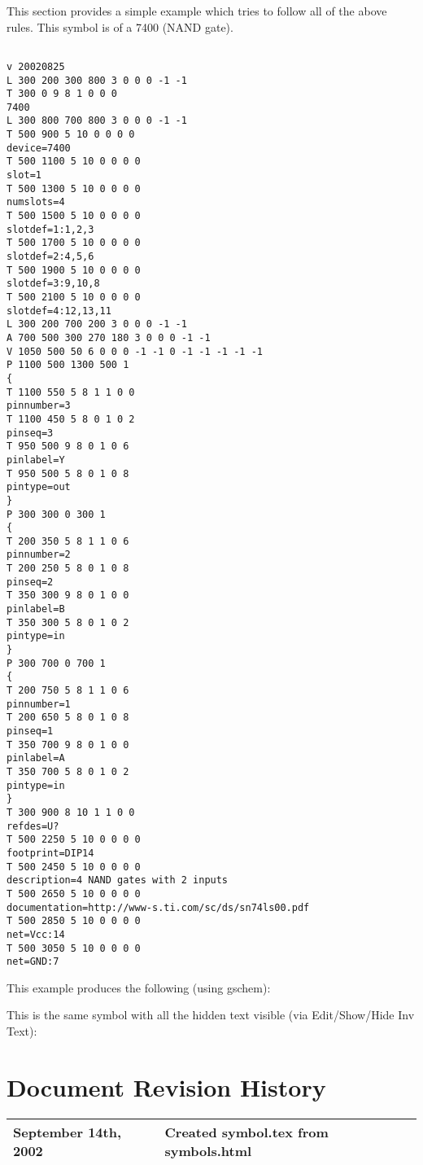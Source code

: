 \documentclass{article}
\begin{document}
This section provides a simple example which tries to follow all of the above
rules.  This symbol is of a 7400 (NAND gate).

\begin{verbatim}

v 20020825
L 300 200 300 800 3 0 0 0 -1 -1
T 300 0 9 8 1 0 0 0
7400
L 300 800 700 800 3 0 0 0 -1 -1
T 500 900 5 10 0 0 0 0
device=7400
T 500 1100 5 10 0 0 0 0
slot=1
T 500 1300 5 10 0 0 0 0
numslots=4
T 500 1500 5 10 0 0 0 0
slotdef=1:1,2,3
T 500 1700 5 10 0 0 0 0
slotdef=2:4,5,6
T 500 1900 5 10 0 0 0 0
slotdef=3:9,10,8
T 500 2100 5 10 0 0 0 0
slotdef=4:12,13,11
L 300 200 700 200 3 0 0 0 -1 -1
A 700 500 300 270 180 3 0 0 0 -1 -1
V 1050 500 50 6 0 0 0 -1 -1 0 -1 -1 -1 -1 -1
P 1100 500 1300 500 1
{
T 1100 550 5 8 1 1 0 0
pinnumber=3
T 1100 450 5 8 0 1 0 2
pinseq=3
T 950 500 9 8 0 1 0 6
pinlabel=Y
T 950 500 5 8 0 1 0 8
pintype=out
}
P 300 300 0 300 1
{
T 200 350 5 8 1 1 0 6
pinnumber=2
T 200 250 5 8 0 1 0 8
pinseq=2
T 350 300 9 8 0 1 0 0
pinlabel=B
T 350 300 5 8 0 1 0 2
pintype=in
}
P 300 700 0 700 1
{
T 200 750 5 8 1 1 0 6
pinnumber=1
T 200 650 5 8 0 1 0 8
pinseq=1
T 350 700 9 8 0 1 0 0
pinlabel=A
T 350 700 5 8 0 1 0 2
pintype=in
}
T 300 900 8 10 1 1 0 0
refdes=U?
T 500 2250 5 10 0 0 0 0
footprint=DIP14
T 500 2450 5 10 0 0 0 0
description=4 NAND gates with 2 inputs
T 500 2650 5 10 0 0 0 0
documentation=http://www-s.ti.com/sc/ds/sn74ls00.pdf
T 500 2850 5 10 0 0 0 0
net=Vcc:14
T 500 3050 5 10 0 0 0 0
net=GND:7
\end{verbatim}

This example produces the following (using gschem): 
\vspace{.125 in}

\begin{center}
\end{center}

This is the same symbol with all the hidden text visible (via Edit/Show/Hide Inv Text):

\begin{center}
\end{center}

\newpage
\section{Document Revision History}

\begin{table}[h]
\begin{tabular}{|l|l|} \hline
September 14th, 2002 & Created symbol.tex from symbols.html \\ \hline

\end{tabular}
\end{table}
\end{document}
